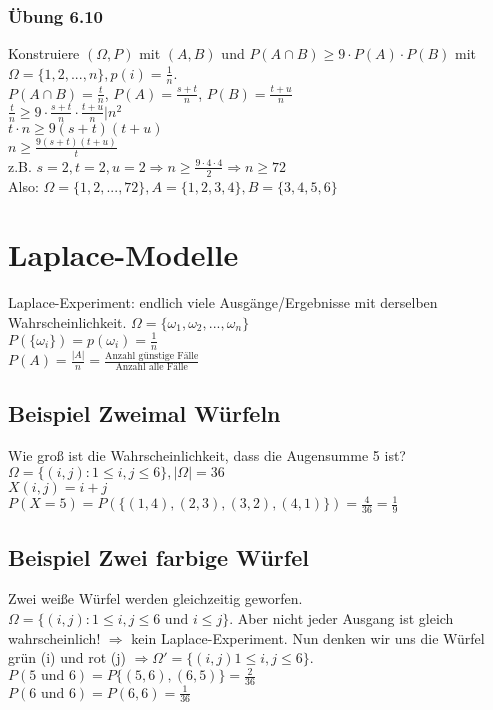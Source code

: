 \subsubsection{Übung 6.10}
Konstruiere $ (\Omega, P) $ mit $(A,B)$ und $ P(A\cap B) \geq 9\cdot P(A) \cdot P(B)$ mit $\Omega=\{1,2,...,n\}, p(i)=\frac{1}{n}$.\\
$ P(A\cap B) = \frac{t}{n}$, $P(A) = \frac{s+t}{n}$, $P(B) = \frac{t+u}{n}$\\
$\frac{t}{n} \geq 9\cdot \frac{s+t}{n} \cdot \frac{t+u}{n} | n^2 $\\
$t\cdot n \geq 9(s+t)(t+u)$\\
$n\geq \frac{9(s+t)(t+u)}{t}$\\
z.B. $s=2, t=2, u=2 \Rightarrow n\geq \frac{9\cdot 4\cdot 4}{2} \Rightarrow n\geq 72$\\
Also: $\Omega=\{1,2,...,72\}, A=\{1,2,3,4\}, B=\{3,4,5,6\} $

\section{Laplace-Modelle}
Laplace-Experiment: endlich viele Ausgänge/Ergebnisse mit derselben Wahrscheinlichkeit. 
$\Omega = \{\omega_1, \omega_2, ..., \omega_n\}$\\
$P(\{\omega_i \})=p(\omega_i)=\frac{1}{n}$\\
$P(A)=\frac{|A|}{n}=\frac{\textrm{Anzahl günstige Fälle}}{\textrm{Anzahl alle Fälle}}$

\subsection{Beispiel Zweimal Würfeln}
Wie groß ist die Wahrscheinlichkeit, dass die Augensumme 5 ist?\\
$\Omega=\{(i,j): 1\leq i,j\leq 6 \}, |\Omega|=36$\\
$X(i,j)=i+j$\\
$P(X=5)=P(\{(1,4),(2,3), (3,2), (4,1) \})=\frac{4}{36}=\frac{1}{9}$

\subsection{Beispiel Zwei farbige Würfel}
Zwei weiße Würfel werden gleichzeitig geworfen. 
$\Omega=\{(i,j): 1\leq i,j\leq 6 \textrm{ und } i\leq j\}$. 
Aber nicht jeder Ausgang ist gleich wahrscheinlich! $\Rightarrow$ kein Laplace-Experiment. 
Nun denken wir uns die Würfel grün (i) und rot (j) $\Rightarrow \Omega'=\{(i,j) 1\leq i,j \leq 6 \}$.\\
$P(5 \textrm{ und } 6) = P\{(5,6), (6,5)\} = \frac{2}{36}$\\
$P(6 \textrm{ und } 6) = P({6,6}) = \frac{1}{36}$ 

